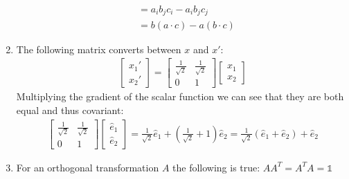 \documentclass[12pt]{article}
\begin{document}
\begin{enumerate}
\begin{align}
      & =a_i b_j c_i-a_i b_j c_j\\
      & =b(a\cdot c)-a(b\cdot c)
    \end{align}
    \item The following matrix converts between $x$ and $x'$:
    \begin{gather}
      \begin{bmatrix}
        x_1' \\
        x_2'
      \end{bmatrix}=
      \begin{bmatrix}
        \frac{1}{\sqrt{2}} & \frac{1}{\sqrt{2}} \\
        0                  & 1
      \end{bmatrix}
      \begin{bmatrix}
        x_1 \\
        x_2
      \end{bmatrix}
    \end{gather}
    Multiplying the gradient of the scalar function we can see that they are both equal and thus covariant:
    \begin{gather}
      \begin{bmatrix}
        \frac{1}{\sqrt{2}} & \frac{1}{\sqrt{2}} \\
        0                  & 1
      \end{bmatrix}
      \begin{bmatrix}
        \hat{e}_1 \\
        \hat{e}_2
      \end{bmatrix}=\frac{1}{\sqrt{2}}\hat{e}_1+\left(\frac{1}{\sqrt{2}}+1\right)\hat{e}_2=\frac{1}{\sqrt{2}}\left( \hat{e}_1+\hat{e}_2\right)+\hat{e}_2
    \end{gather}
    \item For an orthogonal transformation $A$ the following is true: $AA^T=A^T A=\mathbb{1}$
  \end{enumerate}
\end{document}
